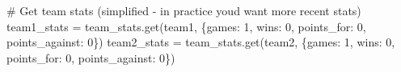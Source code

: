 \documentclass[
  letterpaper,
  DIV=11,
  numbers=noendperiod]{scrartcl}
\newenvironment{Shaded}{\begin{snugshade}}{\end{snugshade}}
\newcommand{\CommentTok}[1]{\textcolor[rgb]{0.37,0.37,0.37}{#1}}
\newcommand{\DecValTok}[1]{\textcolor[rgb]{0.68,0.00,0.00}{#1}}
\newcommand{\NormalTok}[1]{\textcolor[rgb]{0.00,0.23,0.31}{#1}}
\newcommand{\OperatorTok}[1]{\textcolor[rgb]{0.37,0.37,0.37}{#1}}
\newcommand{\StringTok}[1]{\textcolor[rgb]{0.13,0.47,0.30}{#1}}
\begin{document}
\begin{Shaded}
\begin{Highlighting}[]
        \CommentTok{\# Get team stats (simplified {-} in practice you\textquotesingle{}d want more recent stats)}
\NormalTok{        team1\_stats }\OperatorTok{=}\NormalTok{ team\_stats.get(team1, \{}\StringTok{\textquotesingle{}games\textquotesingle{}}\NormalTok{: }\DecValTok{1}\NormalTok{, }\StringTok{\textquotesingle{}wins\textquotesingle{}}\NormalTok{: }\DecValTok{0}\NormalTok{, }\StringTok{\textquotesingle{}points\_for\textquotesingle{}}\NormalTok{: }\DecValTok{0}\NormalTok{, }\StringTok{\textquotesingle{}points\_against\textquotesingle{}}\NormalTok{: }\DecValTok{0}\NormalTok{\})}
\NormalTok{        team2\_stats }\OperatorTok{=}\NormalTok{ team\_stats.get(team2, \{}\StringTok{\textquotesingle{}games\textquotesingle{}}\NormalTok{: }\DecValTok{1}\NormalTok{, }\StringTok{\textquotesingle{}wins\textquotesingle{}}\NormalTok{: }\DecValTok{0}\NormalTok{, }\StringTok{\textquotesingle{}points\_for\textquotesingle{}}\NormalTok{: }\DecValTok{0}\NormalTok{, }\StringTok{\textquotesingle{}points\_against\textquotesingle{}}\NormalTok{: }\DecValTok{0}\NormalTok{\})}
        

\end{Highlighting}
\end{Shaded}
\end{document}
